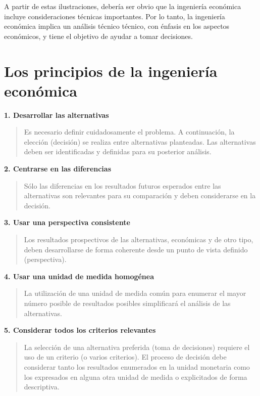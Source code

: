\documentclass[
]{krantz}
\begin{document}
A partir de estas ilustraciones, debería ser obvio que la ingeniería económica incluye consideraciones técnicas importantes. Por lo tanto, la ingeniería económica implica un análisis técnico técnico, con énfasis en los aspectos económicos, y tiene el objetivo de ayudar a tomar decisiones.

\hypertarget{los-principios-de-la-ingenieruxeda-econuxf3mica}{%
\section{Los principios de la ingeniería económica}\label{los-principios-de-la-ingenieruxeda-econuxf3mica}}

\textbf{1. Desarrollar las alternativas}

\begin{quote}
Es necesario definir cuidadosamente el problema. A continuación, la elección (decisión) se realiza entre alternativas planteadas. Las alternativas deben ser identificadas y definidas para su posterior análisis.
\end{quote}

\textbf{2. Centrarse en las diferencias}

\begin{quote}
Sólo las diferencias en los resultados futuros esperados entre las alternativas son relevantes para su comparación y deben considerarse en la decisión.
\end{quote}

\textbf{3. Usar una perspectiva consistente}

\begin{quote}
Los resultados prospectivos de las alternativas, económicas y de otro tipo, deben desarrollarse de forma coherente desde un punto de vista definido (perspectiva).
\end{quote}

\textbf{4. Usar una unidad de medida homogénea}

\begin{quote}
La utilización de una unidad de medida común para enumerar el mayor número posible de resultados posibles simplificará el análisis de las alternativas.
\end{quote}

\textbf{5. Considerar todos los criterios relevantes}

\begin{quote}
La selección de una alternativa preferida (toma de decisiones) requiere el uso de un criterio (o varios criterios). El proceso de decisión debe considerar tanto los resultados enumerados en la unidad monetaria como los expresados en alguna otra unidad de medida o explicitados de forma descriptiva.
\end{quote}
\end{document}
